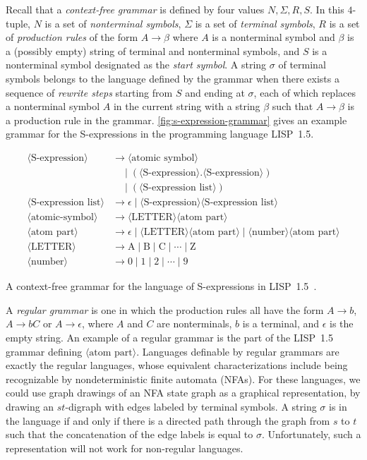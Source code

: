 \documentclass[10pt]{llncs}
\newcommand{\nonterm}[1]{\langle\text{#1}\rangle}
\newcommand{\term}[1]{\text{#1}}
\begin{document}
Recall that a \emph{context-free grammar} is defined by four values $N,\Sigma,R,S$. In this $4$-tuple, $N$ is a set of \emph{nonterminal symbols}, $\Sigma$ is a set of \emph{terminal symbols}, $R$ is a set of \emph{production rules} of the form $A \to \beta$ where $A$ is a nonterminal symbol and $\beta$ is a (possibly empty) string of terminal and nonterminal symbols, and $S$ is a nonterminal symbol designated as the \emph{start symbol}. A string $\sigma$ of terminal symbols belongs to the language defined by the grammar when there exists a sequence of \emph{rewrite steps} starting from $S$ and ending at $\sigma$, each of which replaces a nonterminal symbol $A$ in the current string with a string $\beta$ such that $A \to \beta$ is a production rule in the grammar. \autoref{fig:s-expression-grammar} gives an example grammar for the S-expressions in the programming language LISP~1.5.
\begin{table}[t]
\begin{align*}
\nonterm{S-expression} &\to \nonterm{atomic symbol}\\
                       &\quad\mid  (\nonterm{S-expression} . \nonterm{S-expression})\\
                       &\quad\mid (\nonterm{S-expression list})\\
\nonterm{S-expression list} &\to \epsilon \mid \nonterm{S-expression} \nonterm{S-expression list}\\
\nonterm{atomic-symbol} &\to \nonterm{LETTER}\nonterm{atom part}\\
\nonterm{atom part} &\to \epsilon \mid \nonterm{LETTER}\nonterm{atom part} \mid \nonterm{number}\nonterm{atom part}\\
\nonterm{LETTER} &\to \term{A} \mid \term{B} \mid \term{C} \mid \cdots \mid \term{Z}\\
\nonterm{number} &\to \term{0} \mid \term{1} \mid \term{2} \mid \cdots \mid \term{9}
\end{align*}
\caption{A context-free grammar for the language of S-expressions in LISP~1.5~\cite{lisp-book}.}
\label{fig:s-expression-grammar}
\end{table}

A \emph{regular grammar} is one in which the production rules all have the form $A \to b$, $A \to bC$ or $A \to \epsilon$, where $A$ and $C$ are nonterminals, $b$ is a terminal, and $\epsilon$ is the empty string. An example of a regular grammar is the part of the LISP~1.5 grammar defining $\nonterm{atom part}$.
Languages definable by regular grammars are exactly the regular languages, whose equivalent characterizations include being recognizable by nondeterministic finite automata (NFAs). For these languages, we could use graph drawings of an NFA state graph as a graphical representation, by drawing an $st$-digraph with edges labeled by terminal symbols. A string $\sigma$ is in the language if and only if there is a directed path through the graph from $s$ to $t$ such that the concatenation of the edge labels is equal to $\sigma$. Unfortunately, such a representation will not work for non-regular languages.
\end{document}
